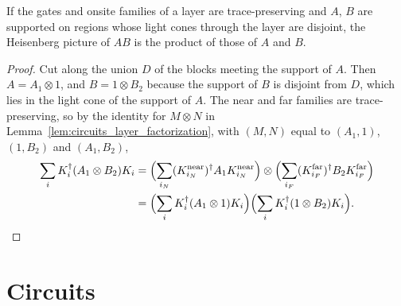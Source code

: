 \begin{lemma}
    \label{lem:circuits_layer_dual_mul}
    \leanok
    If the gates and onsite families of a layer are trace-preserving and $A$, $B$ are
    supported on regions whose light cones through the layer are disjoint, the Heisenberg
    picture of $AB$ is the product of those of $A$ and $B$.
\end{lemma}
\begin{proof}\leanok
    Cut along the union $D$ of the blocks meeting the support of $A$. Then
    $A=A_1\otimes1$, and $B=1\otimes B_2$ because the support of $B$ is disjoint from
    $D$, which lies in the light cone of the support of $A$. The near and far families are
    trace-preserving, so by the identity for $M\otimes N$ in
    Lemma~\ref{lem:circuits_layer_factorization}, with $(M,N)$ equal to $(A_1,1)$, $(1,B_2)$
    and $(A_1,B_2)$,
    \begin{align}
        \sum_iK_i^\dagger(A_1\otimes B_2)K_i
        &=\Bigl(\sum_{i_N}(K^{\mathrm{near}}_{i_N})^\dagger A_1K^{\mathrm{near}}_{i_N}\Bigr)
        \otimes\Bigl(\sum_{i_F}(K^{\mathrm{far}}_{i_F})^\dagger B_2K^{\mathrm{far}}_{i_F}\Bigr)
        \notag\\
        &=\Bigl(\sum_iK_i^\dagger(A_1\otimes1)K_i\Bigr)
        \Bigl(\sum_iK_i^\dagger(1\otimes B_2)K_i\Bigr).
        \notag
    \end{align}
\end{proof}

\section{Circuits}
\label{sec:circuits_circuits}

